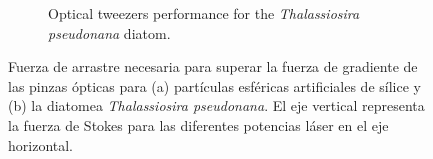 \documentclass[10pt,aspectratio=1610,compress,dvipsnames]{beamer}
\begin{document}
\begin{frame}
{\begin{figure}[H]
\begin{subfigure}[b]{0.49\textwidth}
         \caption{Optical tweezers performance for the \textit{Thalassiosira pseudonana} diatom.}
         \label{figx}
     \end{subfigure}
     \caption{Fuerza de arrastre necesaria para superar la fuerza de gradiente de las pinzas ópticas para (a) partículas esféricas artificiales de sílice y (b) la diatomea \textit{Thalassiosira pseudonana}. El eje vertical representa la fuerza de Stokes para las diferentes potencias láser en el eje horizontal.}
     \hfill
    \label{forces_microfluidcs} 
\end{figure}



}


\end{frame}
\end{document}
